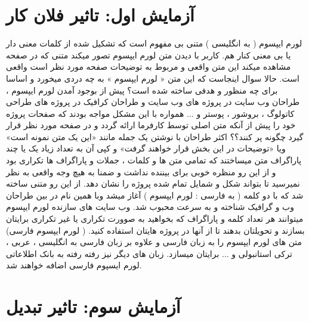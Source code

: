 \section{آزمایش اول: تاثیر فلان کار}
لورم ایپسوم ( به انگلیسی  ) متنی بی مفهوم است که تشکیل شده از کلمات معنی دار یا بی معنی کنار هم. کاربر با دیدن متن لورم ایپسوم تصور میکند متنی که در صفحه مشاهده میکند این متن واقعی و مربوط به توضیحات صفحه مورد نظر است واقعی است. حالا سوال اینجاست که این متن « لورم ایپسوم » به چه دردی میخورد و اساسا برای چه منظور و هدفی ساخته شده است؟ پیش از بوجود آمدن لورم ایپسوم ، طراحان وب سایت در پروژه های وب سایت و طراحان کرافیک در پروژه های طراحی کاتولوگ ، بروشور ، پوستر و ... همواره با این مشکل مواجه بودند که صفحات پروژه خود را پیش از آنکه متن اصلی توسط کارفرما ارائه گردد و در صفحه مورد نظر قرار گیرد چگونه پر کنند؟؟ اکثر طراحان با نوشتن یک جمله مانند «این یک متن نمونه است» ویا «توضیحات در این بخش قرار خواهند گرفت» و کپی آن به تعداد زیاد یک یا چند پاراگراف متن میساختند که تمامی متن ها و کلمات ، جملات و پاراگراف ها تکراری بود و از این رو منظره خوبی برای بیننده نداشت و ضمنا به هیچ وجه واقعی به نظر نمیرسید تا بتواند شکل و شمایل تمام شده پروژه را نشان دهد. از این رو متنی ساخته شد که با دو کلمه ( به فارسی : لورم ایپسوم ) آغاز میشد وبا همین نام در بین طراحان وب و گرافیک شناخته و به سرعت محبوب شد. وب سایت های سازنده لورم ایپسوم میتوانند هر تعداد کلمه و پاراگراف که بخواهید به صوورت تکراری یا غیر تکراری برایتان بسازند و تحویلتان بدهند تا از آنها در پروژه هایتان استفاده کنید. ( لورم ایپسوم فارسی) متن های لورم ایپسوم را به زبان فارسی و علاوه بر زبان فارسی به انگلیسی ، عربی ، ترکی استانبولی و ... برایتان میسازد. زبان های دیگر نیز رفته رفته به بانک اطلاعاتی لورم ایسپوم فارسی اضافه خواهند شد.  

\section{آزمایش سوم: تاثیر تبدیل}

